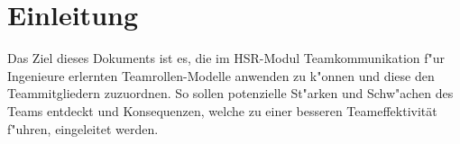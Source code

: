 
\chapter{Einleitung}
Das Ziel dieses Dokuments ist es, die im HSR-Modul Teamkommunikation f"ur Ingenieure erlernten
Teamrollen-Modelle\cite{belbin1981management} anwenden zu k"onnen und diese den Teammitgliedern zuzuordnen. So sollen potenzielle
St"arken und Schw"achen des Teams entdeckt und Konsequenzen, welche zu einer besseren Teameffektivität f"uhren, eingeleitet werden.